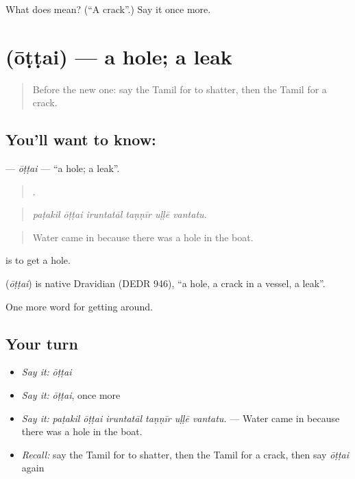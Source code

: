 \begin{tcolorbox}[breakable,colback=teal!4,colframe=teal!35!black,title={Before you move on}]
What does  mean? (\textquotedblleft{}A crack\textquotedblright{}.) Say it once more.
\end{tcolorbox}
\section[\texorpdfstring{\ta{ஓட்டை} (ōṭṭai)}{ஓட்டை (ōṭṭai)}]{ (ōṭṭai) — a hole; a leak}

\label{lesson:TA-C443-ottai}



\begin{quote}
Before the new one: say the Tamil for to shatter, then the Tamil for a crack.
\end{quote}

\subsection*{You'll want to know: }
\textbf{} — \emph{ōṭṭai} — \textquotedblleft{}a hole; a leak\textquotedblright{}.

\begin{quote}
     .
\end{quote}

\begin{quote}
\emph{paṭakil ōṭṭai iruntatāl taṇṇīr uḷḷē vantatu.}
\end{quote}

\begin{quote}
Water came in because there was a hole in the boat.
\end{quote}

  is to get a hole.

\begin{cousinweb}
\textbf{} (\emph{ōṭṭai}) is native Dravidian (DEDR 946), \textquotedblleft{}a hole, a crack in a vessel, a leak\textquotedblright{}.
\end{cousinweb}

\begin{grammarlens}[title={What you've built}]
One more word for getting around.
\end{grammarlens}

\subsection*{Your turn}
\begin{itemize}
\raggedright
  \item \emph{Say it:} \emph{ōṭṭai}
  \item \emph{Say it:} \emph{ōṭṭai}, once more
  \item \emph{Say it:} \emph{paṭakil ōṭṭai iruntatāl taṇṇīr uḷḷē vantatu.} — Water came in because there was a hole in the boat.
  \item \emph{Recall:} say the Tamil for to shatter, then the Tamil for a crack, then say \emph{ōṭṭai} again
\end{itemize}

